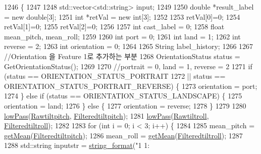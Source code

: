 \begin{DoxyCode}
1246                                        \{
1247 
1248     std::vector<std::string> input;
1249 
1250     \textcolor{keywordtype}{double} *result\_label = \textcolor{keyword}{new} \textcolor{keywordtype}{double}[3];
1251     \textcolor{keywordtype}{int} *retVal = \textcolor{keyword}{new} \textcolor{keywordtype}{int}[3];
1252 
1253     retVal[0]=0;
1254     retVal[1]=0;
1255     retVal[2]=0;
1256 
1257     \textcolor{keywordtype}{int} cast\_label = 0;
1258     \textcolor{keywordtype}{float} mean\_pitch, mean\_roll;
1259 
1260     \textcolor{keywordtype}{int} port = 0;
1261     \textcolor{keywordtype}{int} land = 1;
1262     \textcolor{keywordtype}{int} reverse = 2;
1263     \textcolor{keywordtype}{int} orientation = 0;
1264 
1265     String label\_history;
1266 
1267     \textcolor{comment}{//Orientation 을 Feature 1로 추가하는 부분}
1268     OrientationStatus status = GetOrientationStatus();
1269 
1270     \textcolor{comment}{//portrait = 0, land = 1, reverse = 2}
1271     \textcolor{keywordflow}{if} (status == ORIENTATION\_STATUS\_PORTRAIT
1272             || status == ORIENTATION\_STATUS\_PORTRAIT\_REVERSE) \{
1273         orientation = port;
1274     \} \textcolor{keywordflow}{else} \textcolor{keywordflow}{if} (status == ORIENTATION\_STATUS\_LANDSCAPE) \{
1275         orientation = land;
1276     \} \textcolor{keywordflow}{else} \{
1277         orientation = reverse;
1278     \}
1279 
1280     \hyperlink{class_calculator_form_a7219388d7692193e44e149d822035231}{lowPass}(\hyperlink{class_calculator_form_a7b784d40a3d83eee41bb8efae09142ca}{Rawtiltpitch}, \hyperlink{class_calculator_form_a54065fa7531b14c744c8d11ccd849f81}{Filteredtiltpitch});
1281     \hyperlink{class_calculator_form_a7219388d7692193e44e149d822035231}{lowPass}(\hyperlink{class_calculator_form_afc8797d0cb7657a384ccc03c7f335aed}{Rawtiltroll}, \hyperlink{class_calculator_form_a63438d1ef5396e2d216eaf604659c96c}{Filteredtiltroll});
1282 
1283     \textcolor{keywordflow}{for} (\textcolor{keywordtype}{int} i = 0; i < 3; i++) \{
1284 
1285         mean\_pitch = \hyperlink{class_calculator_form_a832965e97b000380703993d2c61e357a}{getMean}(\hyperlink{class_calculator_form_a54065fa7531b14c744c8d11ccd849f81}{Filteredtiltpitch});
1286         mean\_roll = \hyperlink{class_calculator_form_a832965e97b000380703993d2c61e357a}{getMean}(\hyperlink{class_calculator_form_a63438d1ef5396e2d216eaf604659c96c}{Filteredtiltroll});
1287 
1288         std::string inputstr = \hyperlink{_calculator_form_8cpp_a89016affff07b7f39247021035532b50}{string\_format}(\textcolor{stringliteral}{"1 1:%
}
\end{DoxyCode}
